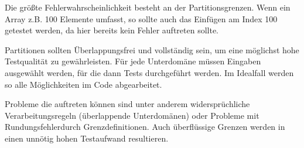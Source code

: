 Die größte Fehlerwahrscheinlichkeit besteht an der Partitionsgrenzen. Wenn ein Array z.B. 100 Elemente umfasst, so sollte auch das Einfügen am Index 100 getestet werden, da hier bereits kein Fehler auftreten sollte.

Partitionen sollten Überlappungsfrei und vollständig sein, um eine möglichst hohe Testqualität zu gewährleisten. Für jede Unterdomäne müssen Eingaben ausgewählt werden, für die dann Tests durchgeführt werden. Im Idealfall werden so alle Möglichkeiten im Code abgearbeitet.

Probleme die auftreten können sind unter anderem widersprüchliche Verarbeitungsregeln (überlappende Unterdomänen) oder Probleme mit Rundungsfehlerdurch Grenzdefinitionen. Auch überflüssige Grenzen werden in einen unnötig hohen Testaufwand resultieren.



